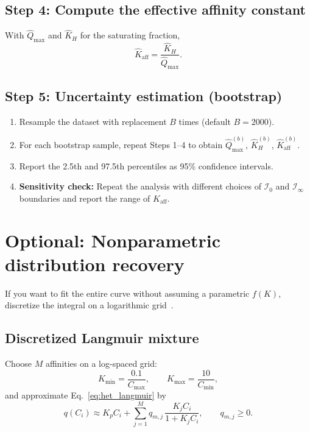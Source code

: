 \documentclass[12pt]{article}
\begin{document}
\subsection{Step 4: Compute the effective affinity constant}

With $\widehat{Q}_{\max}$ and $\widehat{K}_H$ for the saturating
fraction,
\begin{equation}
  \widehat{K}_{\mathrm{aff}} = \frac{\widehat{K}_H}{\widehat{Q}_{\max}}.
  \label{eq:Kaff_est}
\end{equation}

\subsection{Step 5: Uncertainty estimation (bootstrap)}

\begin{enumerate}[nosep]
  \item Resample the dataset with replacement $B$ times (default $B=2000$).
  \item For each bootstrap sample, repeat Steps 1--4 to obtain $\widehat{Q}_{\max}^{(b)}$, $\widehat{K}_H^{(b)}$, $\widehat{K}_{\mathrm{aff}}^{(b)}$.
  \item Report the 2.5th and 97.5th percentiles as 95\% confidence intervals.
  \item \textbf{Sensitivity check:} Repeat the analysis with different choices of $\mathcal{I}_0$ and $\mathcal{I}_\infty$ boundaries  and report the range of $K_{\mathrm{aff}}$.
\end{enumerate}

\section{Optional: Nonparametric distribution recovery}

If you want to fit the entire curve without assuming a parametric $f(K)$,
discretize the integral on a logarithmic
grid~\cite{Umpleby2001,Umpleby2004,Nederlof1990}.

\subsection{Discretized Langmuir mixture}

Choose $M$ affinities on a log-spaced grid:
\[
  K_{\min} = \frac{0.1}{C_{\max}},\qquad
  K_{\max} = \frac{10}{C_{\min}},
\]
and approximate Eq.~\eqref{eq:het_langmuir} by
\begin{equation}
  q(C_i) \approx K_p C_i + \sum_{j=1}^{M} q_{m,j}\,\frac{K_j C_i}{1+K_j C_i},
  \qquad q_{m,j}\ge 0.
  \label{eq:disc_mix}
\end{equation}
\end{document}
